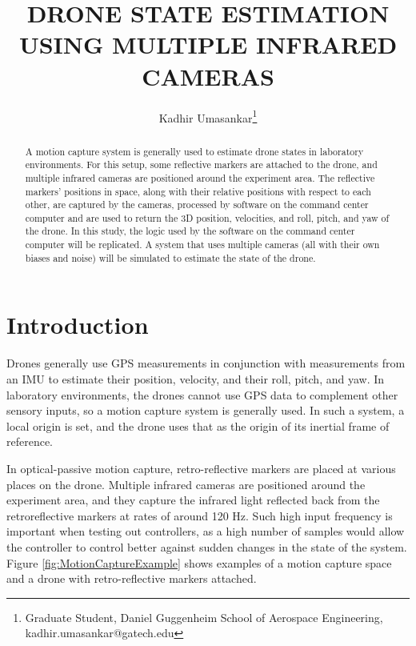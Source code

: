 \documentclass[letterpaper, preprint, paper,11pt]{AAS}	%
\begin{document}
\title{DRONE STATE ESTIMATION USING MULTIPLE INFRARED CAMERAS}

\author{Kadhir Umasankar\thanks{Graduate Student, Daniel Guggenheim School of Aerospace Engineering, kadhir.umasankar@gatech.edu}}


\maketitle{} 		


\begin{abstract}
A motion capture system is generally used to estimate drone states in laboratory environments. For this setup, some reflective markers are attached to the drone, and multiple infrared cameras are positioned around the experiment area. The reflective markers' positions in space, along with their relative positions with respect to each other, are captured by the cameras, processed by software on the command center computer and are used to return the 3D position, velocities, and roll, pitch, and yaw of the drone. In this study, the logic used by the software on the command center computer will be replicated. A system that uses multiple cameras (all with their own biases and noise) will be simulated to estimate the state of the drone.
\end{abstract}


\section{Introduction}
Drones generally use GPS measurements in conjunction with measurements from an IMU to estimate their position, velocity, and their roll, pitch, and yaw. In laboratory environments, the drones cannot use GPS data to complement other sensory inputs, so a motion capture system is generally used\cite{vicon_2022}. In such a system, a local origin is set, and the drone uses that as the origin of its inertial frame of reference.

In optical-passive motion capture, retro-reflective markers are placed at various places on the drone. Multiple infrared cameras are positioned around the experiment area, and they capture the infrared light reflected back from the retroreflective markers at rates of around 120 Hz. Such high input frequency is important when testing out controllers, as a high number of samples would allow the controller to control better against sudden changes in the state of the system. Figure \ref{fig:MotionCaptureExample} shows examples of a motion capture space and a drone with retro-reflective markers attached.
\end{document}
